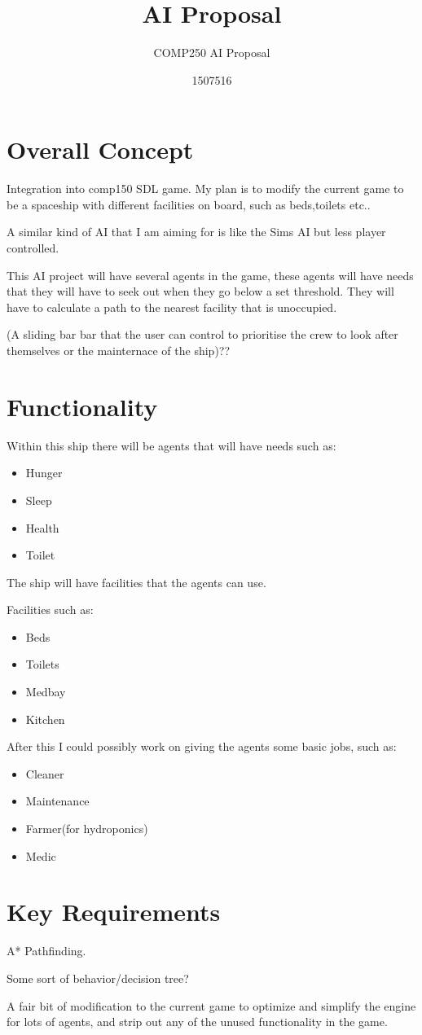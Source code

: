 \documentclass{scrartcl}
\title{AI Proposal}
\subtitle{COMP250 AI Proposal}
\author{1507516}
\begin{document}
\maketitle

\section{Overall Concept}
Integration into comp150 SDL game.
My plan is to modify the current game to be a spaceship with different facilities on board, such as beds,toilets etc..

A similar kind of AI that I am aiming for is like the Sims AI but less player controlled.

This AI project will have several agents in the game, these agents will have needs that they will have to seek out when they go below a set threshold. 
They will have to calculate a path to the nearest facility that is unoccupied.

(A sliding bar bar that the user can control to prioritise the crew to look after themselves or the mainternace of the ship)??


\section{Functionality}
Within this ship there will be agents that will have needs such as:

\begin{itemize}
  \item Hunger
  \item Sleep
  \item Health
  \item Toilet
\end{itemize}

The ship will have facilities that the agents can use.

Facilities such as:

\begin{itemize}
  \item Beds
  \item Toilets
  \item Medbay
  \item Kitchen
\end{itemize}

After this I could possibly work on giving the agents some basic jobs, such as:

\begin{itemize}
	\item Cleaner
	\item Maintenance
	\item Farmer(for hydroponics)
	\item Medic
\end{itemize}

\section{Key Requirements}

A* Pathfinding.

Some sort of behavior/decision tree?

A fair bit of modification to the current game to optimize and simplify the engine for lots of agents, and strip out any of the unused functionality in the game.
\end{document}

